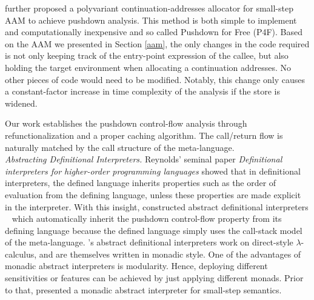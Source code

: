 \documentclass[acmsmall, screen]{acmart}\settopmatter{}
\begin{document}
 further proposed a polyvariant continuation-addresses allocator
for small-step AAM to achieve pushdown analysis. This method is both
simple to implement and computationally inexpensive and so called Pushdown for Free (P4F).
Based on the AAM we presented in Section \ref{aam}, the only changes in the code required is not
only keeping track of the entry-point expression of the callee, but also holding the target
environment when allocating a continuation addresses. No other pieces of code would need to be
modified. Notably, this change only causes a constant-factor increase in time complexity of
the analysis if the store is widened.

Our work establishes the pushdown control-flow analysis through refunctionalization and a
proper caching algorithm. The call/return flow is naturally matched by the call structure
of the meta-language. \\

\textit{Abstracting Definitional Interpreters.}
Reynolds' seminal paper \emph{Definitional interpreters for higher-order programming languages}
\cite{Reynolds:72, Reynolds:HOSC98-revisited} showed that in definitional interpreters, the
defined language inherits properties such as the order of evaluation from the defining
language, unless these properties are made explicit in the interpreter. With this insight,
\citeauthor{darais2017abstracting} constructed abstract definitional interpreters
~\cite{darais2017abstracting, darais2017thesis} which automatically inherit the pushdown 
control-flow property from its defining language because the defined language simply uses 
the call-stack model of the meta-language.
\citeauthor{darais2017abstracting}'s abstract definitional interpreters work on direct-style
$\lambda$-calculus, and are themselves written in monadic style. One of the advantages of monadic
abstract interpreters is modularity. Hence, deploying different sensitivities
or features can be achieved by just applying different monads. Prior to that, \citet{Sergey:2013:MAI:2491956.2491979}
presented a monadic abstract interpreter for small-step semantics.
\end{document}
